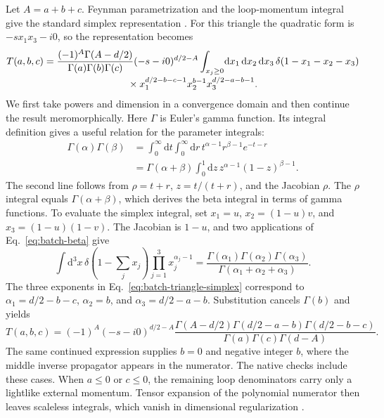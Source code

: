 Let \(A=a+b+c\). Feynman parametrization and the loop-momentum integral give the standard simplex representation \cite{Weinzierl2022}. For this triangle the quadratic form is \(-s x_1x_3-i0\), so the representation becomes
\begin{align}
 T(a,b,c)
 &=
 \frac{(-1)^A\Gamma(A-d/2)}{\Gamma(a)\Gamma(b)\Gamma(c)}
 (-s-i0)^{d/2-A}
 \int_{x_j\ge0}\!\mathrm dx_1\,\mathrm dx_2\,\mathrm dx_3\,
 \delta(1-x_1-x_2-x_3)
 \nonumber\\[-2pt]
 &\hspace{30mm}\times
 x_1^{d/2-b-c-1}x_2^{b-1}x_3^{d/2-a-b-1}.
 \label{eq:batch-triangle-simplex}
\end{align}
We first take powers and dimension in a convergence domain and then continue the result meromorphically. Here \(\Gamma\) is Euler's gamma function. Its integral definition gives a useful relation for the parameter integrals:
\begin{align}
 \Gamma(\alpha)\Gamma(\beta)
 &=\int_0^\infty\!\mathrm dt\int_0^\infty\!\mathrm dr\,
 t^{\alpha-1}r^{\beta-1}e^{-t-r}
 \nonumber\\
 &=\Gamma(\alpha+\beta)
 \int_0^1\!\mathrm dz\,z^{\alpha-1}(1-z)^{\beta-1}.
 \label{eq:batch-beta}
\end{align}
The second line follows from \(\rho=t+r\), \(z=t/(t+r)\), and the Jacobian \(\rho\). The \(\rho\) integral equals \(\Gamma(\alpha+\beta)\), which derives the beta integral in terms of gamma functions. To evaluate the simplex integral, set \(x_1=u\), \(x_2=(1-u)v\), and \(x_3=(1-u)(1-v)\). The Jacobian is \(1-u\), and two applications of Eq.~\eqref{eq:batch-beta} give
\begin{equation}
 \int\!\mathrm d^3x\,\delta(1-\textstyle\sum_jx_j)
 \prod_{j=1}^3x_j^{\alpha_j-1}
 =
 \frac{\Gamma(\alpha_1)\Gamma(\alpha_2)\Gamma(\alpha_3)}
 {\Gamma(\alpha_1+\alpha_2+\alpha_3)}.
 \label{eq:batch-dirichlet}
\end{equation}
The three exponents in Eq.~\eqref{eq:batch-triangle-simplex} correspond to
\(\alpha_1=d/2-b-c\), \(\alpha_2=b\), and \(\alpha_3=d/2-a-b\). Substitution cancels \(\Gamma(b)\) and yields
\begin{equation}
 T(a,b,c)=
 (-1)^A(-s-i0)^{d/2-A}
 \frac{\Gamma(A-d/2)\Gamma(d/2-a-b)\Gamma(d/2-b-c)}
 {\Gamma(a)\Gamma(c)\Gamma(d-A)}.
 \label{eq:batch-triangle-gamma}
\end{equation}
The same continued expression supplies \(b=0\) and negative integer \(b\), where the middle inverse propagator appears in the numerator. The native checks include these cases. When \(a\le0\) or \(c\le0\), the remaining loop denominators carry only a lightlike external momentum. Tensor expansion of the polynomial numerator then leaves scaleless integrals, which vanish in dimensional regularization \cite{Weinzierl2022}.

